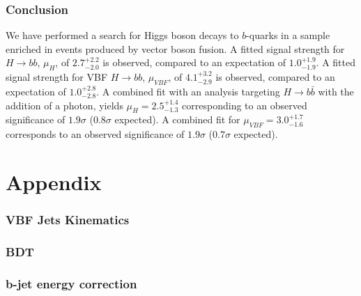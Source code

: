 \documentclass[UKenglish,texlive=2013]{\ATLASLATEXPATH atlasdoc}
\begin{document}
\section{Conclusion}
\label{sec:conclusion}

We have performed a search for Higgs boson decays to $b$-quarks in a sample enriched in events produced by vector boson fusion. A fitted signal strength for $H\rightarrow bb$, $\mu_H$, of $2.7^{+2.2}_{-2.0}$ is observed, compared to an expectation of $1.0^{+1.9}_{-1.9}$. A fitted signal strength for VBF $H\rightarrow bb$, $\mu_{VBF}$, of $4.1^{+3.2}_{-2.9}$ is observed, compared to an expectation of $1.0^{+2.8}_{-2.8}$.  A combined fit with an analysis targeting $H\rightarrow b\bar{b}$ with the addition of a photon, yields $\mu_H = 2.5^{+1.4}_{-1.3}$ corresponding to an observed significance of $1.9\sigma$ ($0.8\sigma$ expected). A combined fit for $\mu_{VBF} = 3.0^{+1.7}_{-1.6}$ corresponds to an observed significance of $1.9\sigma$ ($0.7\sigma$ expected). 


\clearpage
\appendix
\part*{Appendix}

\clearpage
\section{VBF Jets Kinematics}
\label{sec:app-kinematics}


\clearpage
\section{BDT} 
\label{sec:app-bdt}


\clearpage
\section{b-jet energy correction}
\label{sec:app-masscorrection}

\end{document}
